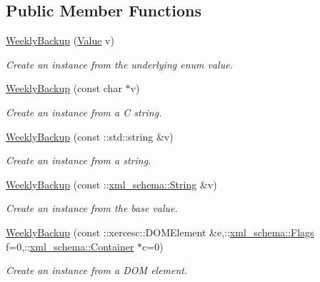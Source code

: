 \subsection*{Public Member Functions}
\begin{DoxyCompactItemize}
\item 
\hyperlink{classopenstack_1_1xml_1_1WeeklyBackup_a677e818579f475bd814d0aba27475d7f}{WeeklyBackup} (\hyperlink{classopenstack_1_1xml_1_1WeeklyBackup_ac41dd439f5277968c6540768c12ddcb0}{Value} v)
\begin{DoxyCompactList}\small\item\em Create an instance from the underlying enum value. \item\end{DoxyCompactList}\item 
\hyperlink{classopenstack_1_1xml_1_1WeeklyBackup_ab63912bd0bd57b18c4453af4277f764f}{WeeklyBackup} (const char $\ast$v)
\begin{DoxyCompactList}\small\item\em Create an instance from a C string. \item\end{DoxyCompactList}\item 
\hyperlink{classopenstack_1_1xml_1_1WeeklyBackup_a8499b22ab7eda3fe2f04b08ef7c41f23}{WeeklyBackup} (const ::std::string \&v)
\begin{DoxyCompactList}\small\item\em Create an instance from a string. \item\end{DoxyCompactList}\item 
\hyperlink{classopenstack_1_1xml_1_1WeeklyBackup_a06732971db47a7a454039feadce5bc63}{WeeklyBackup} (const ::\hyperlink{namespacexml__schema_af6757b5701ccc893f3b551bd70e0c94d}{xml\_\-schema::String} \&v)
\begin{DoxyCompactList}\small\item\em Create an instance from the base value. \item\end{DoxyCompactList}\item 
\hyperlink{classopenstack_1_1xml_1_1WeeklyBackup_aceac30f3dbe1b31ee03369e12317a1da}{WeeklyBackup} (const ::xercesc::DOMElement \&e,::\hyperlink{namespacexml__schema_affb4c227cbd9aa7453dd1dc5a1401943}{xml\_\-schema::Flags} f=0,::\hyperlink{namespacexml__schema_a333dea2213742aea47a37532dec4ec27}{xml\_\-schema::Container} $\ast$c=0)
\begin{DoxyCompactList}\small\item\em Create an instance from a DOM element. \item\end{DoxyCompactList}\item 

\end{DoxyCompactItemize}
